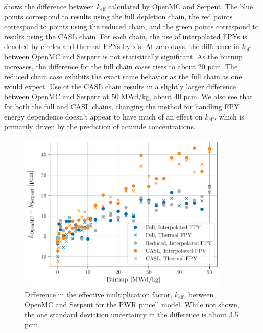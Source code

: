 \documentclass[3p,authoryear]{elsarticle}
\begin{document}
 shows the difference between $k_\text{eff}$ calculated by
OpenMC and Serpent. The blue points correspond to results using the full
depletion chain, the red points correspond to points using the reduced chain,
and the green points correspond to results using the CASL chain. For each chain,
the use of interpolated FPYs is denoted by circles and thermal FPYs by x's. At
zero days, the difference in $k_\text{eff}$ between OpenMC and Serpent is not
statistically significant. As the burnup increases, the difference for the full
chain cases rises to about 20 pcm. The reduced chain case exhibits the exact
same behavior as the full chain as one would expect. Use of the CASL chain
results in a slightly larger difference between OpenMC and Serpent at 50 MWd/kg,
about 40 pcm. We also see that for both the full and CASL chains, changing the
method for handling FPY energy dependence doesn't appear to have much of an
effect on $k_\text{eff}$, which is primarily driven by the prediction of
actinide concentrations.
\begin{figure}[H]
  \centering
  \includegraphics[width=4in]{figures/pwr_keff.pdf}
  \caption{Difference in the effective multiplication factor, $k_\text{eff}$,
  between OpenMC and Serpent for the PWR pincell model. While not shown, the one
  standard deviation uncertainty in the difference is about 3.5 pcm.}
  \label{fig:pwr-keff}
\end{figure}
\end{document}
